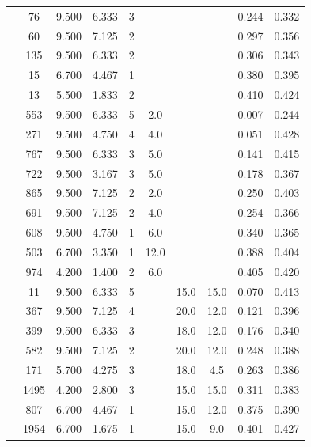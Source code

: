\begin{table}
{\begin{tabular}{c S[table-format=2.0] S[table-format=1.3]
        S[table-format=1.3] S[table-format=1.0] S[table-format=2.1] S[table-format=2.1]
        S[table-format=2.1] S[table-format=1.3] S[table-format=1.3]}
                    &   76 & 9.500 & 6.333 & 3 &      &      &      & 0.244 & 0.332 \\
                    &   60 & 9.500 & 7.125 & 2 &      &      &      & 0.297 & 0.356 \\
                    &  135 & 9.500 & 6.333 & 2 &      &      &      & 0.306 & 0.343 \\
                    &   15 & 6.700 & 4.467 & 1 &      &      &      & 0.380 & 0.395 \\
                    &   13 & 5.500 & 1.833 & 2 &      &      &      & 0.410 & 0.424 \\
        \addlinespace[0.5em]
        \fact{}     &  553 & 9.500 & 6.333 & 5 &  2.0 &      &      & 0.007 & 0.244\\
                    &  271 & 9.500 & 4.750 & 4 &  4.0 &      &      & 0.051 & 0.428\\
                    &  767 & 9.500 & 6.333 & 3 &  5.0 &      &      & 0.141 & 0.415\\
                    &  722 & 9.500 & 3.167 & 3 &  5.0 &      &      & 0.178 & 0.367\\
                    &  865 & 9.500 & 7.125 & 2 &  2.0 &      &      & 0.250 & 0.403\\
                    &  691 & 9.500 & 7.125 & 2 &  4.0 &      &      & 0.254 & 0.366\\
                    &  608 & 9.500 & 4.750 & 1 &  6.0 &      &      & 0.340 & 0.365\\
                    &  503 & 6.700 & 3.350 & 1 & 12.0 &      &      & 0.388 & 0.404\\
                    &  974 & 4.200 & 1.400 & 2 &  6.0 &      &      & 0.405 & 0.420\\
        \addlinespace[0.5em]
        \tcc{}      &   11 & 9.500 & 6.333 & 5 &      & 15.0 & 15.0 & 0.070 & 0.413\\
                    &  367 & 9.500 & 7.125 & 4 &      & 20.0 & 12.0 & 0.121 & 0.396\\
                    &  399 & 9.500 & 6.333 & 3 &      & 18.0 & 12.0 & 0.176 & 0.340\\
                    &  582 & 9.500 & 7.125 & 2 &      & 20.0 & 12.0 & 0.248 & 0.388\\
                    &  171 & 5.700 & 4.275 & 3 &      & 18.0 &  4.5 & 0.263 & 0.386\\
                    & 1495 & 4.200 & 2.800 & 3 &      & 15.0 & 15.0 & 0.311 & 0.383\\
                    &  807 & 6.700 & 4.467 & 1 &      & 15.0 & 12.0 & 0.375 & 0.390\\
                    & 1954 & 6.700 & 1.675 & 1 &      & 15.0 &  9.0 & 0.401 & 0.427\\
    \end{tabular}}
\end{table}